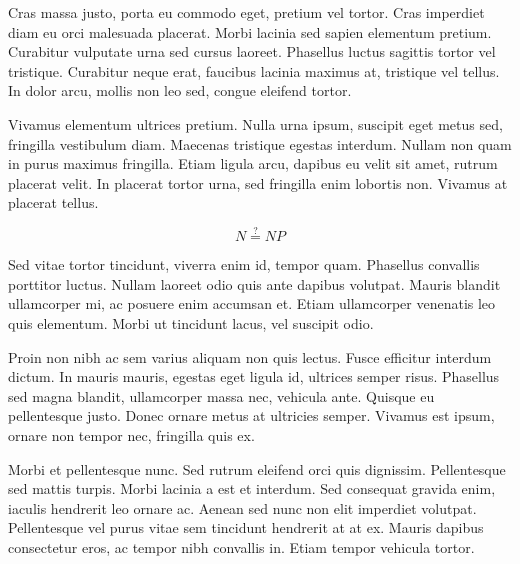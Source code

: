 Cras massa justo, porta eu commodo eget, pretium vel tortor. Cras imperdiet diam eu orci malesuada placerat. Morbi lacinia sed sapien elementum pretium. Curabitur vulputate urna sed cursus laoreet. Phasellus luctus sagittis tortor vel tristique. Curabitur neque erat, faucibus lacinia maximus at, tristique vel tellus. In dolor arcu, mollis non leo sed, congue eleifend tortor.

Vivamus elementum ultrices pretium. Nulla urna ipsum, suscipit eget metus sed, fringilla vestibulum diam. Maecenas tristique egestas interdum. Nullam non quam in purus maximus fringilla. Etiam ligula arcu, dapibus eu velit sit amet, rutrum placerat velit. In placerat tortor urna, sed fringilla enim lobortis non. Vivamus at placerat tellus. 

\begin{equation}
  N \stackrel{?}{=} NP
\end{equation}

Sed vitae tortor tincidunt, viverra enim id, tempor quam. Phasellus convallis porttitor luctus. Nullam laoreet odio quis ante dapibus volutpat. Mauris blandit ullamcorper mi, ac posuere enim accumsan et. Etiam ullamcorper venenatis leo quis elementum. Morbi ut tincidunt lacus, vel suscipit odio.

Proin non nibh ac sem varius aliquam non quis lectus. Fusce efficitur interdum dictum. In mauris mauris, egestas eget ligula id, ultrices semper risus. Phasellus sed magna blandit, ullamcorper massa nec, vehicula ante. Quisque eu pellentesque justo. Donec ornare metus at ultricies semper. Vivamus est ipsum, ornare non tempor nec, fringilla quis ex. 

Morbi et pellentesque nunc. Sed rutrum eleifend orci quis dignissim. Pellentesque sed mattis turpis. Morbi lacinia a est et interdum. Sed consequat gravida enim, iaculis hendrerit leo ornare ac. Aenean sed nunc non elit imperdiet volutpat. Pellentesque vel purus vitae sem tincidunt hendrerit at at ex. Mauris dapibus consectetur eros, ac tempor nibh convallis in. Etiam tempor vehicula tortor.